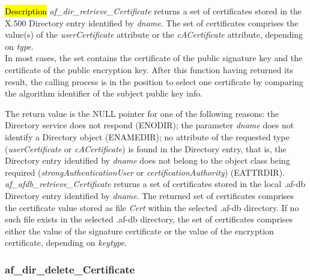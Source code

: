 

\hl{Description}
{\em af\_dir\_retrieve\_Certificate} returns a set of certificates stored in the 
X.500 Directory entry identified by {\em dname}. The set of certificates comprises the
value(s) of the {\em userCertificate} attribute or the {\em cACertificate} attribute,
depending on {\em type}. \\
In most cases, the set contains the certificate of the public signature key and the 
certificate of the public encryption key. After this function having returned 
its result, the calling process is in the position to select one certificate 
by comparing the algorithm identifier of the subject public key info.

The return value is the NULL pointer for one of the following reasons:
\bi
\m the Directory service does not respond (ENODIR);
\m the parameter {\em dname} does not identify a Directory object (ENAMEDIR);
\m no attribute of the requested type ({\em userCertificate} or {\em cACertificate})
is found in the Directory entry, that is, the Directory entry identified by {\em dname} 
does not belong to the object class being required ({\em strongAuthenticationUser} or  
{\em certificationAuthority}) (EATTRDIR).
\ei
{\em af\_afdb\_retrieve\_Certificate} returns a set of certificates stored in the 
local .af-db Directory entry identified by {\em dname}.
The returned set of certificates comprises the certificate value stored as file {\em Cert}
within the selected .af-db directory. If no such file exists
in the selected .af-db directory, the set of certificates comprises either the
value of the signature certificate or the value of the encryption certificate, 
depending on {\em keytype}.



\subsubsection{af\_dir\_delete\_Certificate}

